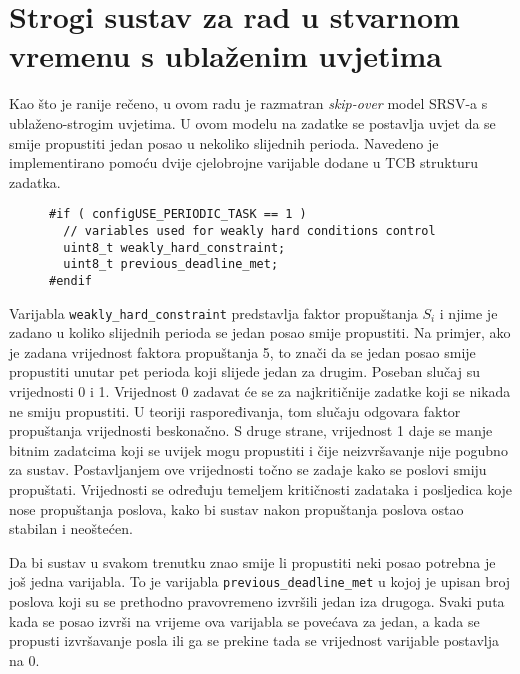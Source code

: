 \documentclass[../zavrsni.tex]{subfiles}
\begin{document}
\section{Strogi sustav za rad u stvarnom vremenu s ublaženim uvjetima}

Kao što je ranije rečeno, u ovom radu je razmatran \textit{skip-over} model SRSV-a s ublaženo-strogim uvjetima.
U ovom modelu na zadatke se postavlja uvjet da se smije propustiti jedan posao u nekoliko slijednih perioda.
Navedeno je implementirano pomoću dvije cjelobrojne varijable dodane u TCB strukturu zadatka.

\begin{figure}[h]
\centering
\begin{lstlisting}[style=CStyle,caption={Varijable dodane u strukturu za kontrolu zadataka},captionpos=b]
#if ( configUSE_PERIODIC_TASK == 1 )
  // variables used for weakly hard conditions control
  uint8_t weakly_hard_constraint;
  uint8_t previous_deadline_met;
#endif
\end{lstlisting}
\end{figure}

Varijabla \texttt{weakly\_hard\_constraint} predstavlja faktor propuštanja $S_i$ i njime je zadano u koliko slijednih perioda se jedan posao smije propustiti.
Na primjer, ako je zadana vrijednost faktora propuštanja 5, to znači da se jedan posao smije propustiti unutar pet perioda 
koji slijede jedan za drugim.
Poseban slučaj su vrijednosti 0 i 1. Vrijednost 0 zadavat će se za najkritičnije zadatke koji se nikada ne smiju propustiti. 
U teoriji raspoređivanja, tom slučaju odgovara faktor propuštanja vrijednosti beskonačno.
S druge strane, vrijednost 1 daje se manje bitnim zadatcima koji se uvijek mogu propustiti i čije neizvršavanje nije pogubno za sustav.
Postavljanjem ove vrijednosti točno se zadaje kako se poslovi smiju propuštati. Vrijednosti se određuju 
temeljem kritičnosti zadataka i posljedica koje nose propuštanja poslova, kako bi sustav nakon propuštanja poslova ostao 
stabilan i neoštećen.

Da bi sustav u svakom trenutku znao smije li propustiti neki posao potrebna je još jedna varijabla. To je varijabla 
\texttt{previous\_deadline\_met} u kojoj je upisan broj poslova koji su se prethodno pravovremeno izvršili jedan iza drugoga.
Svaki puta kada se posao izvrši na vrijeme ova varijabla se povećava za jedan, a kada se propusti izvršavanje posla ili ga se prekine tada 
se vrijednost varijable postavlja na 0.
\end{document}
